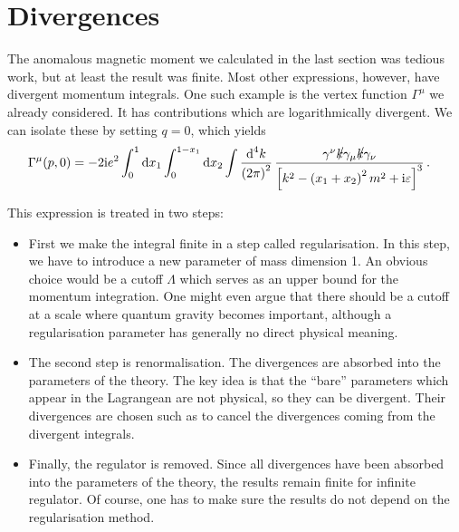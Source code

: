 \documentclass[12pt]{report}
\renewcommand{\slash}[2][4]{\ensuremath{\rlap{\raisebox{1pt}{$\mspace{#1mu}/$}}#2}}
\renewcommand{\d}{\text{d}}
\renewcommand{\i}{\ensuremath{\text{i}}}
\newcommand{\2}{\ensuremath{\sqrt{2}\,}}
\renewcommand{\d}{\ensuremath{\text{d}}}
\begin{document}
{      

    \section{Divergences}
      The anomalous magnetic moment we calculated in the last section was tedious work, but at least
      the result was finite. Most other expressions, however, have divergent  momentum
      integrals. One such example is the vertex function $\Gamma^\mu$ we already considered. It has
      contributions which are logarithmically divergent. We can isolate these by setting $q=0$,
      which yields
      \begin{align}\label{eq:vertex_q=0}
        \Gamma^\mu (p,0)&= -2\i e^2 \int_0^1 \d x_1 \int_0^{1-x_1} \d x_2 \int\frac{\d^4
          k}{\left(2\pi\right)^2} \, \frac{\gamma^\nu\slash[2]{k} \gamma_\mu \slash[2]{k}
          \gamma_\nu}{\left[k^2 -\left(x_1+x_2\right)^2 m^2 +\i \varepsilon \right]^3}\,.
      \end{align}
      
      This expression is treated in two steps:
      \begin{itemize}
        \item First we make the integral finite in a step called
          regularisation. In this step, we 
          have to introduce a new parameter of mass dimension 1. An obvious choice would be a
          cutoff $\Lambda$ which serves as an upper bound for the momentum integration. One might
          even argue that there should be a cutoff at a scale where quantum gravity 
          becomes important, although a
          regularisation parameter has generally no direct physical meaning.
        \item The second step is renormalisation. The divergences are
          absorbed into the parameters 
          of the theory. The key idea is that the ``bare'' parameters which appear in the Lagrangean
          are not physical, so they can be divergent. Their divergences are chosen such as to cancel
          the divergences coming from the divergent integrals.
        \item Finally, the regulator is removed. Since all divergences have been absorbed into 
          the parameters of the theory,
          the results remain finite for infinite regulator. Of course, one has to make sure the 
          results do not depend on the regularisation method.
      \end{itemize}
      
}
\end{document}
